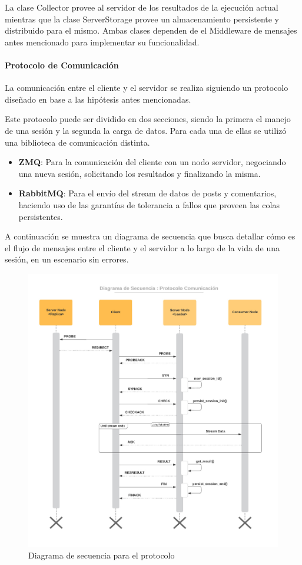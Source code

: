 \documentclass[titlepage,a4paper,oneside]{article}
\begin{document}
La clase Collector provee al servidor de los resultados de la ejecución actual mientras que la clase ServerStorage provee un almacenamiento persistente y distribuido para el mismo. Ambas clases dependen de el Middleware de mensajes antes mencionado para implementar su funcionalidad.

\paragraph{Protocolo de Comunicación}

La comunicación entre el cliente y el servidor se realiza siguiendo un protocolo diseñado en base a las hipótesis antes mencionadas.

Este protocolo puede ser dividido en dos secciones, siendo la primera el manejo de una sesión y la segunda la carga de datos. Para cada una de ellas se utilizó una biblioteca de comunicación distinta.

\begin{itemize}
    \item \textbf{ZMQ}: Para la comunicación del cliente con un nodo servidor, negociando una nueva sesión, solicitando los resultados y finalizando la misma.
    \item \textbf{RabbitMQ}: Para el envío del stream de datos de posts y comentarios, haciendo uso de las garantías de tolerancia a fallos que proveen las colas persistentes.

\end{itemize}

A continuación se muestra un diagrama de secuencia que busca detallar cómo es el flujo de mensajes entre el cliente y el servidor a lo largo de la vida de una sesión, en un escenario sin errores.

\begin{figure}[H]
	\centering
	\includegraphics[width=13cm]{img/protocolo_secuencia.jpeg}
	\caption{Diagrama de secuencia para el protocolo}
\end{figure}
\end{document}
